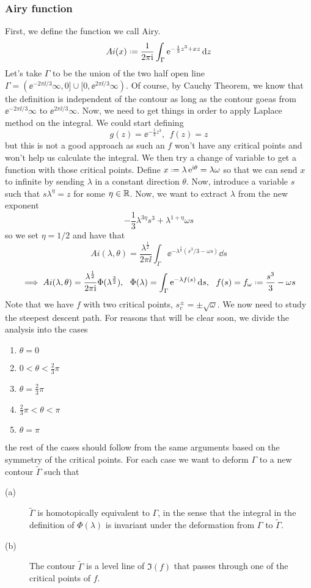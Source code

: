 \subsubsection{Airy function}

First, we define the function we call Airy. 
$$Ai(x) \deff \frac{1}{2\pi \ii} \int_{\Gamma} \ee^{-\frac{1}{3} z^3 + x z} \dd z$$ 
Let's take $\Gamma$ to be the union of the two half open line $\Gamma = (\ee^{-2\pi\ii / 3}\infty, 0] \cup [0, \ee^{2\pi\ii / 3} \infty)$. Of course, by Cauchy Theorem, we know that the definition is independent of the contour as long as the contour goeas from $\ee^{-2\pi\ii / 3}\infty$ to $\ee^{2\pi\ii / 3}\infty$. Now, we need to get things in order to apply Laplace method on the integral. We could start defining
$$g(z) = \ee^{-\frac{1}{3} z^3}, \ \ f(z) = z$$
but this is not a good approach as such an $f$ won't have any critical points and won't help us calculate the integral. We then try a change of variable to get a function with those critical points. Define $x \deff \lambda \ee^{\ii \theta} = \lambda \omega$ so that we can send $x$ to infinite by sending $\lambda$ in a constant direction $\theta$. Now, introduce a variable $s$ such that $s\lambda^{\eta} = z$ for some $\eta \in \mathbb{R}$. Now, we want to extract $\lambda$ from the new exponent 
$$-\frac{1}{3}\lambda^{3\eta}s^3 + \lambda^{1+\eta} \omega s$$
so we set $\eta = 1/2$ and have that
$$Ai(\lambda, \theta) = \frac{\lambda^{\frac{1}{2}}}{2\pi \ii} \int_{\Gamma} \ee^{-\lambda^{\frac{3}{2}}(s^3/3 - \omega s)} \dd s$$
$$\implies Ai(\lambda, \theta) = \frac{\lambda^{\frac{1}{2}}}{2\pi \ii}\Phi(\lambda^{\frac{3}{2}}) , \ \ \Phi(\lambda) = \int_{\Gamma} \ee^{-\lambda f(s)} \dd s, \ \ f(s) = f_{\omega} \deff \frac{s^3}{3} - \omega s $$ 
Note that we have $f$ with two critical points, $s_c^{\pm} = \pm \sqrt{\omega}$. We now need to study the steepest descent path. For reasons that will be clear soon, we divide the analysis into the cases
\begin{enumerate}
	\item $\theta = 0$
	\item $0< \theta < \frac{2}{3} \pi$	
	\item $\theta = \frac{2}{3} \pi$
	\item $\frac{2}{3} \pi < \theta < \pi$
	\item $\theta  = \pi$
\end{enumerate}
the rest of the cases should follow from the same arguments based on the symmetry of the critical points. For each case we want to deform $\Gamma$ to a new contour $\tilde{\Gamma}$ such that
\begin{description}
	\item[(a)] $\tilde{\Gamma}$ is homotopically equivalent to $\Gamma$, in the sense that the integral in the definition of $\Phi(\lambda)$ is invariant under the deformation from $\Gamma$ to $\tilde{\Gamma}$.
	\item[(b)] The contour $\tilde{\Gamma}$ is a level line of $\Im{(f)}$ that passes through one of the critical points of $f$.
\end{description}

